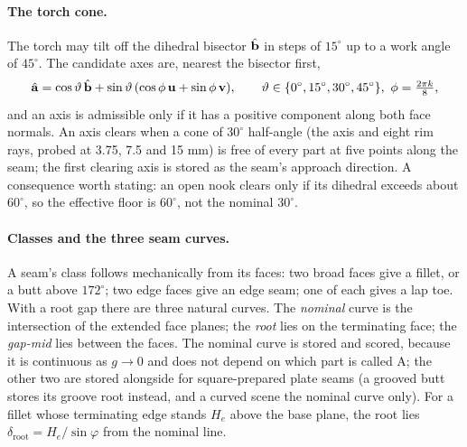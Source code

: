 \paragraph{The torch cone.} The torch may tilt off the dihedral bisector $\hat{\mathbf{b}}$ in
steps of $15^\circ$ up to a work angle of $45^\circ$. The candidate axes are, nearest the
bisector first,
\begin{equation}
\hat{\mathbf{a}}=\cos\vartheta\,\hat{\mathbf{b}}+\sin\vartheta\,(\cos\phi\,\mathbf{u}+\sin\phi\,\mathbf{v}),\qquad
\vartheta\in\{0^\circ,15^\circ,30^\circ,45^\circ\},\ \phi=\tfrac{2\pi k}{8},
\label{eq:ws_axes}
\end{equation}
and an axis is admissible only if it has a positive component along both face normals. An
axis clears when a cone of $30^\circ$ half-angle (the axis and eight rim rays, probed at 3.75,
7.5 and 15 mm) is free of every part at five points along the seam; the first clearing axis
is stored as the seam's approach direction. A consequence worth stating: an open nook clears
only if its dihedral exceeds about $60^\circ$, so the effective floor is $60^\circ$, not the
nominal $30^\circ$.

\paragraph{Classes and the three seam curves.} A seam's class follows mechanically from its
faces: two broad faces give a fillet, or a butt above $172^\circ$; two edge faces give an
edge seam; one of each gives a lap toe. With a root gap there are three natural curves. The
\emph{nominal} curve is the intersection of the extended face planes; the \emph{root} lies
on the terminating face; the \emph{gap-mid} lies between the faces. The nominal curve is
stored and scored, because it is continuous as $g\to0$ and does not depend on which part is
called A; the other two are stored alongside for square-prepared plate seams (a grooved butt
stores its groove root instead, and a curved scene the nominal curve only). For a fillet whose terminating
edge stands $H_e$ above the base plane, the root lies $\delta_{\mathrm{root}}=H_e/\sin\varphi$
from the nominal line.

